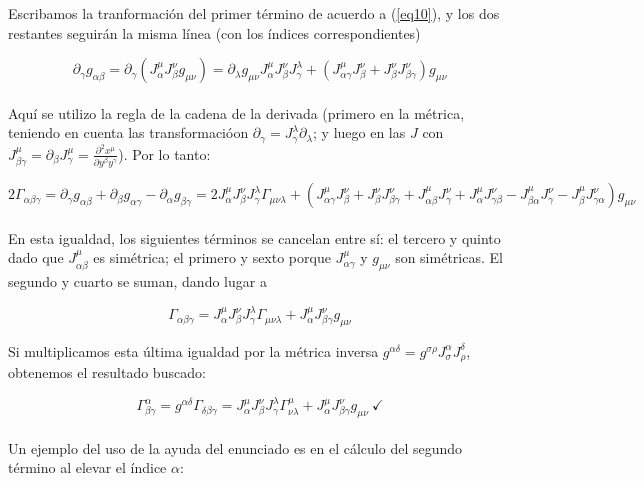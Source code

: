 Escribamos la tranformaci\'on del primer t\'ermino de acuerdo a (\ref{eq10}), y los dos restantes seguir\'an la misma l\'inea (con los \'indices correspondientes)

$$ \partial_{\gamma}g_{\alpha \beta} =  \partial_{\gamma}(J^{\mu}_{\alpha}J^{\nu}_{\beta}g_{\mu \nu}) = \partial_{\lambda}g_{\mu \nu}J^{\mu}_{\alpha}J^{\nu}_{\beta}J^{\lambda}_{\gamma} + (J^{\mu}_{\alpha \gamma}J^{\nu}_{\beta} + J^{\nu}_{\beta}J^{\nu}_{\beta \gamma})g_{\mu \nu}$$\\

Aqu\'i se utilizo la regla de la cadena de la derivada (primero en la m\'etrica, teniendo en cuenta las transformaci\'oon $\partial_{\gamma} = J^{\lambda}_{\gamma}\partial_{\lambda}$; y luego en las $J$ con $J^{\mu}_{\beta \gamma} = \partial_{\beta}J^{\mu}_{\gamma} = \frac{\partial^{2}x^{\mu}}{\partial y^{\beta}y^{\gamma}}$). Por lo tanto:

$$2\Gamma_{\alpha \beta \gamma} = \partial_{\gamma}g_{\alpha \beta} + \partial_{\beta}g_{\alpha \gamma} - \partial_{\alpha}g_{\beta \gamma} = 2J^{\mu}_{\alpha}J^{\nu}_{\beta}J^{\lambda}_{\gamma}\Gamma_{\mu \nu \lambda} + (J^{\mu}_{\alpha \gamma}J^{\nu}_{\beta} + J^{\nu}_{\beta}J^{\nu}_{\beta \gamma} + J^{\mu}_{\alpha \beta}J^{\nu}_{\gamma} + J^{\mu}_{\alpha}J^{\nu}_{\gamma \beta} - J^{\mu}_{\beta \alpha}J^{\nu}_{\gamma} - J^{\mu}_{\beta}J^{\nu}_{\gamma \alpha})g_{\mu \nu}$$\\

En esta igualdad, los siguientes t\'erminos se cancelan entre s\'i: el tercero y quinto dado que $J^{\mu}_{\alpha \beta}$ es sim\'etrica; el primero y sexto porque $J^{\mu}_{\alpha \gamma}$ y $g_{\mu \nu}$ son sim\'etricas. El segundo y cuarto se suman, dando lugar a

$$\Gamma_{\alpha \beta \gamma} = J^{\mu}_{\alpha}J^{\nu}_{\beta}J^{\lambda}_{\gamma}\Gamma_{\mu \nu \lambda} + J^{\mu}_{\alpha}J^{\nu}_{\beta \gamma}g_{\mu \nu}$$

Si multiplicamos esta \'ultima igualdad por la m\'etrica inversa $g^{\alpha \delta} = g^{\sigma \rho}J^{\alpha}_{\sigma}J^{\delta}_{\rho}$, obtenemos el resultado buscado:

$$\Gamma^{\alpha}_{\beta \gamma} = g^{\alpha \delta}\Gamma_{\delta \beta \gamma} = J^{\mu}_{\alpha}J^{\nu}_{\beta}J^{\lambda}_{\gamma}\Gamma^{\mu}_{\nu \lambda} + J^{\mu}_{\alpha}J^{\nu}_{\beta \gamma}g_{\mu \nu}\ \checkmark$$\\

Un ejemplo del uso de la ayuda del enunciado es en el c\'alculo del segundo t\'ermino al elevar el \'indice $\alpha$:

